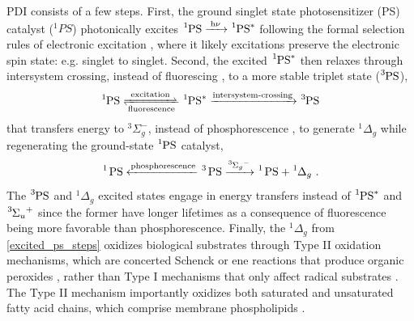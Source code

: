 PDI consists of a few steps. First, the ground singlet state photosensitizer (PS) catalyst ($^1PS$) photonically excites $\ce{^1PS ->[h\nu] ^1PS^*}$ following the formal selection rules of electronic excitation \cite{Bowen1936ForbiddenLines}, where it likely excitations preserve the electronic spin state: e.g. singlet to singlet. Second, the excited $\ce{^1PS^*}$ then relaxes through intersystem crossing, instead of fluorescing \cite{Kessel1982DeterminantsSpectra}, to a more stable triplet state ($\ce{^3PS}$),
\begin{equation} \label{ps_excitation_steps}
    \ce{^1PS <=>[{excitation}][{fluorescence}] ^1PS^* ->[{intersystem-crossing}] ^3PS}
\end{equation}
that transfers energy to $^3\Sigma_g^-$, instead of phosphorescence \cite{Mcrae1958Enhancement6}, to generate $^1\Delta_g$ while regenerating the ground-state $\ce{^1PS}$ catalyst,
\begin{equation} \label{excited_ps_steps}
    \ce{^1 PS <-[{phosphorescence}] ^3 PS ->[^3\Sigma_g^-] ^1 PS + ^1\Delta_g}~.
\end{equation}
The $\ce{^3PS}$ and $^1\Delta_g$ excited states engage in energy transfers instead of $\ce{^1PS^*}$ and $\ce{^3\Sigma_u^+}$ since the former have longer lifetimes as a consequence of fluorescence being more favorable than phosphorescence. Finally, the $^1\Delta_g$ from \cref{excited_ps_steps} oxidizes biological substrates through Type II oxidation mechanisms, which are concerted Schenck \cite{Prein1996TheApplications} or ene \cite{Adam1996DiastereoselectiveComparison} reactions that produce organic peroxides \cite{Foote1965ChemistrySelectivity}, rather than Type I mechanisms \cite{Bolland1949KineticsOxidation,Farmer1943TheRubber,Grynova2011RevisingAutooxidation} that only affect radical substrates \cite{Litwinienko1999DifferentialEsters}. The Type II mechanism importantly oxidizes both saturated and unsaturated fatty acid chains, which comprise membrane phospholipids \cite{ODonnell1985NumericalStaphylococci}.

